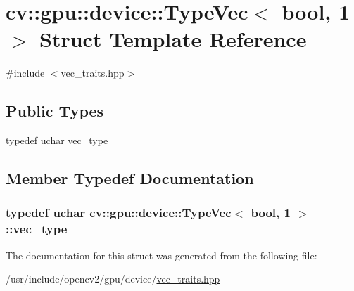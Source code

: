 \hypertarget{structcv_1_1gpu_1_1device_1_1TypeVec_3_01bool_00_011_01_4}{\section{cv\-:\-:gpu\-:\-:device\-:\-:Type\-Vec$<$ bool, 1 $>$ Struct Template Reference}
\label{structcv_1_1gpu_1_1device_1_1TypeVec_3_01bool_00_011_01_4}
}


{\ttfamily \#include $<$vec\-\_\-traits.\-hpp$>$}

\subsection*{Public Types}
\begin{DoxyCompactItemize}
\item 
typedef \hyperlink{core_2types__c_8h_a65f85814a8290f9797005d3b28e7e5fc}{uchar} \hyperlink{structcv_1_1gpu_1_1device_1_1TypeVec_3_01bool_00_011_01_4_adb79ac8f6f34bb772c7ef860e76de414}{vec\-\_\-type}
\end{DoxyCompactItemize}


\subsection{Member Typedef Documentation}
\hypertarget{structcv_1_1gpu_1_1device_1_1TypeVec_3_01bool_00_011_01_4_adb79ac8f6f34bb772c7ef860e76de414}{
\subsubsection[{vec\-\_\-type}]{\setlength{\rightskip}{0pt plus 5cm}typedef {\bf uchar} {\bf cv\-::gpu\-::device\-::\-Type\-Vec}$<$ bool, 1 $>$\-::{\bf vec\-\_\-type}}}\label{structcv_1_1gpu_1_1device_1_1TypeVec_3_01bool_00_011_01_4_adb79ac8f6f34bb772c7ef860e76de414}


The documentation for this struct was generated from the following file\-:\begin{DoxyCompactItemize}
\item 
/usr/include/opencv2/gpu/device/\hyperlink{vec__traits_8hpp}{vec\-\_\-traits.\-hpp}\end{DoxyCompactItemize}
